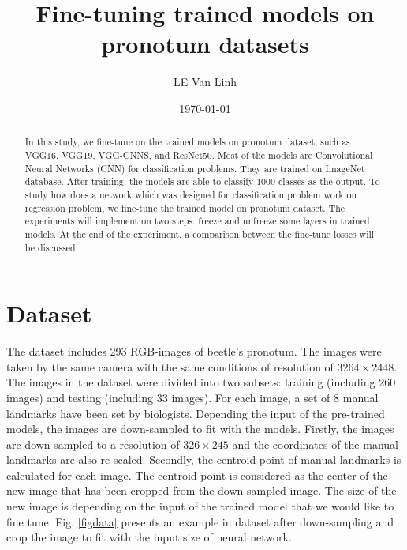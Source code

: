 \documentclass[12pt,a4paper]{article}
\begin{document}
\title{Fine-tuning trained models on pronotum datasets}
\author{LE Van Linh}
\date{\today}
\maketitle
\begin{abstract}
	In this study, we fine-tune on the trained models on pronotum dataset, such as VGG16, VGG19, VGG-CNNS, and ResNet50. Most of the models are Convolutional Neural Networks (CNN) for classification problems. They are trained on ImageNet database. After training, the models are able to classify $1000$ classes as the output. To study how does a network which was designed for classification problem work on regression problem, we fine-tune the trained model on pronotum dataset. The experiments will implement on two steps: freeze and unfreeze some layers in trained models. At the end of the experiment, a comparison between the fine-tune losses will be discussed.
\end{abstract}
\section{Dataset}
The dataset includes 293 RGB-images of beetle's pronotum. The images were taken by the same camera with the same conditions of resolution of $3264 \times 2448$. The images in the dataset were divided into two subsets: training (including $260$ images) and testing (including $33$ images). For each image, a set of 8 manual landmarks have been set by biologists. Depending the input of the pre-trained models, the images are down-sampled to fit with the models. Firstly, the images are down-sampled to a resolution of $326 \times 245$ and the coordinates of the manual landmarks are also re-scaled. Secondly, the centroid point of manual landmarks is calculated for each image. The centroid point is considered as the center of the new image that has been cropped from the down-sampled image. The size of the new image is depending on the input of the trained model that we would like to fine tune. Fig. \ref{figdata} presents an example in dataset after down-sampling and crop the image to fit with the input size of neural network.
\end{document}
